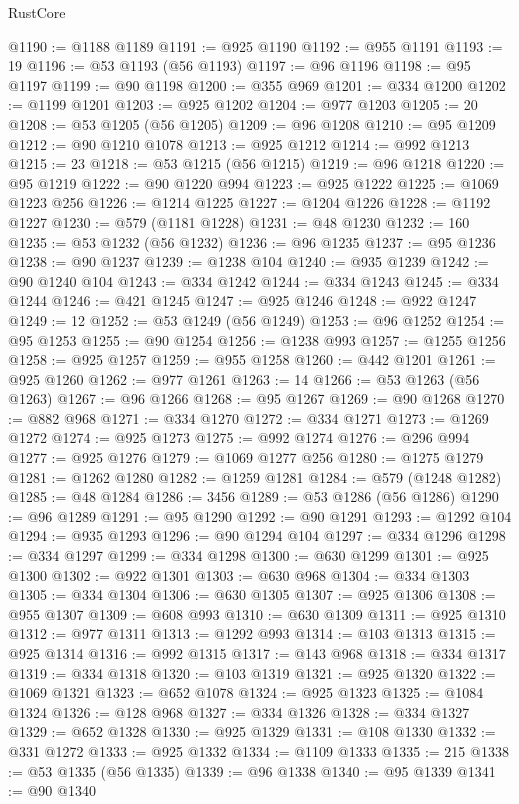\begin{lexlean}{RustCore}
\begin{coremodule}
@1190 := @1188 @1189
@1191 := @925 @1190
@1192 := @955 @1191
@1193 := 19
@1196 := @53 @1193 (@56 @1193)
@1197 := @96 @1196
@1198 := @95 @1197
@1199 := @90 @1198
@1200 := @355 @969
@1201 := @334 @1200
@1202 := @1199 @1201
@1203 := @925 @1202
@1204 := @977 @1203
@1205 := 20
@1208 := @53 @1205 (@56 @1205)
@1209 := @96 @1208
@1210 := @95 @1209
@1212 := @90 @1210 @1078
@1213 := @925 @1212
@1214 := @992 @1213
@1215 := 23
@1218 := @53 @1215 (@56 @1215)
@1219 := @96 @1218
@1220 := @95 @1219
@1222 := @90 @1220 @994
@1223 := @925 @1222
@1225 := @1069 @1223 @256
@1226 := @1214 @1225
@1227 := @1204 @1226
@1228 := @1192 @1227
@1230 := @579 (@1181 @1228)
@1231 := @48 @1230
@1232 := 160
@1235 := @53 @1232 (@56 @1232)
@1236 := @96 @1235
@1237 := @95 @1236
@1238 := @90 @1237
@1239 := @1238 @104
@1240 := @935 @1239
@1242 := @90 @1240 @104
@1243 := @334 @1242
@1244 := @334 @1243
@1245 := @334 @1244
@1246 := @421 @1245
@1247 := @925 @1246
@1248 := @922 @1247
@1249 := 12
@1252 := @53 @1249 (@56 @1249)
@1253 := @96 @1252
@1254 := @95 @1253
@1255 := @90 @1254
@1256 := @1238 @993
@1257 := @1255 @1256
@1258 := @925 @1257
@1259 := @955 @1258
@1260 := @442 @1201
@1261 := @925 @1260
@1262 := @977 @1261
@1263 := 14
@1266 := @53 @1263 (@56 @1263)
@1267 := @96 @1266
@1268 := @95 @1267
@1269 := @90 @1268
@1270 := @882 @968
@1271 := @334 @1270
@1272 := @334 @1271
@1273 := @1269 @1272
@1274 := @925 @1273
@1275 := @992 @1274
@1276 := @296 @994
@1277 := @925 @1276
@1279 := @1069 @1277 @256
@1280 := @1275 @1279
@1281 := @1262 @1280
@1282 := @1259 @1281
@1284 := @579 (@1248 @1282)
@1285 := @48 @1284
@1286 := 3456
@1289 := @53 @1286 (@56 @1286)
@1290 := @96 @1289
@1291 := @95 @1290
@1292 := @90 @1291
@1293 := @1292 @104
@1294 := @935 @1293
@1296 := @90 @1294 @104
@1297 := @334 @1296
@1298 := @334 @1297
@1299 := @334 @1298
@1300 := @630 @1299
@1301 := @925 @1300
@1302 := @922 @1301
@1303 := @630 @968
@1304 := @334 @1303
@1305 := @334 @1304
@1306 := @630 @1305
@1307 := @925 @1306
@1308 := @955 @1307
@1309 := @608 @993
@1310 := @630 @1309
@1311 := @925 @1310
@1312 := @977 @1311
@1313 := @1292 @993
@1314 := @103 @1313
@1315 := @925 @1314
@1316 := @992 @1315
@1317 := @143 @968
@1318 := @334 @1317
@1319 := @334 @1318
@1320 := @103 @1319
@1321 := @925 @1320
@1322 := @1069 @1321
@1323 := @652 @1078
@1324 := @925 @1323
@1325 := @1084 @1324
@1326 := @128 @968
@1327 := @334 @1326
@1328 := @334 @1327
@1329 := @652 @1328
@1330 := @925 @1329
@1331 := @108 @1330
@1332 := @331 @1272
@1333 := @925 @1332
@1334 := @1109 @1333
@1335 := 215
@1338 := @53 @1335 (@56 @1335)
@1339 := @96 @1338
@1340 := @95 @1339
@1341 := @90 @1340

\end{coremodule}
\end{lexlean}
